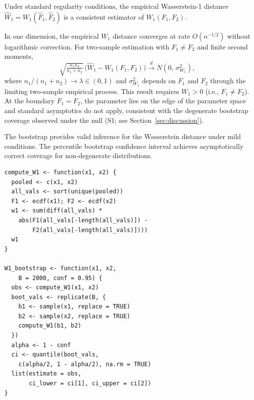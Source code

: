 \documentclass[AMA,Times1COL]{WileyNJDv5}
\begin{document}

Under standard regularity conditions, the empirical Wasserstein-1 distance $\widehat{W}_1 = W_1(\hat{F}_1, \hat{F}_2)$ is a consistent estimator of $W_1(F_1, F_2)$.\cite{delbarrio1999}

In one dimension, the empirical $W_1$ distance converges at rate $O(n^{-1/2})$ without logarithmic correction.\cite{delbarrio1999} For two-sample estimation with $F_1 \neq F_2$ and finite second moments,
\begin{equation}
\sqrt{\tfrac{n_1 n_2}{n_1 + n_2}}\,\bigl(\widehat{W}_1 - W_1(F_1, F_2)\bigr) \xrightarrow{d} N(0,\, \sigma^2_{W_1}),
\label{eq:asymptotic_normality}
\end{equation}
where $n_1/(n_1 + n_2) \to \lambda \in (0,1)$ and $\sigma^2_{W_1}$ depends on $F_1$ and $F_2$ through the limiting two-sample empirical process.\cite{delbarrio1999} This result requires $W_1 > 0$ (i.e., $F_1 \neq F_2$). At the boundary $F_1 = F_2$, the parameter lies on the edge of the parameter space and standard asymptotics do not apply, consistent with the degenerate bootstrap coverage observed under the null (S1; see Section~\ref{sec:discussion}).

The bootstrap provides valid inference for the Wasserstein distance under mild conditions.\cite{sommerfeld2018} The percentile bootstrap confidence interval achieves asymptotically correct coverage for non-degenerate distributions.


\begin{lstlisting}[caption={R function for computing the Wasserstein-1 distance with bootstrap confidence intervals.},label=lst:nabcd,basicstyle=\fontsize{8}{10}\selectfont\ttfamily]
compute_W1 <- function(x1, x2) {
  pooled <- c(x1, x2)
  all_vals <- sort(unique(pooled))
  F1 <- ecdf(x1); F2 <- ecdf(x2)
  w1 <- sum(diff(all_vals) *
    abs(F1(all_vals[-length(all_vals)]) -
        F2(all_vals[-length(all_vals)])))
  w1
}

W1_bootstrap <- function(x1, x2,
    B = 2000, conf = 0.95) {
  obs <- compute_W1(x1, x2)
  boot_vals <- replicate(B, {
    b1 <- sample(x1, replace = TRUE)
    b2 <- sample(x2, replace = TRUE)
    compute_W1(b1, b2)
  })
  alpha <- 1 - conf
  ci <- quantile(boot_vals,
    c(alpha/2, 1 - alpha/2), na.rm = TRUE)
  list(estimate = obs,
       ci_lower = ci[1], ci_upper = ci[2])
}
\end{lstlisting}
\end{document}
